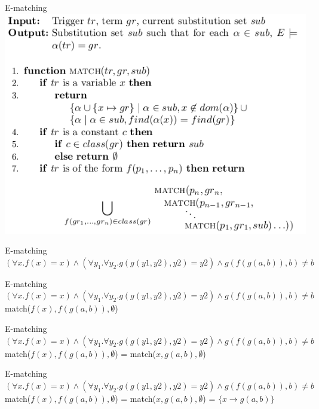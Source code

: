 \documentclass{beamer}
\begin{document}
\begin{frame}{E-matching}
\includegraphics[scale=0.5]{e-matching.png}
\end{frame}

\begin{frame}{E-matching}
$(\forall x.f(x) = x) \wedge (\forall y_1 .\forall y_2 .g(g(y1, y2), y2) = y2) \wedge g(f(g(a, b)), b) \neq b$\newline
\end{frame}

\begin{frame}{E-matching}
$(\forall x.f(x) = x) \wedge (\forall y_1 .\forall y_2 .g(g(y1, y2), y2) = y2) \wedge g(f(g(a, b)), b) \neq b$\newline
match($f(x), f(g(a, b)), \emptyset$)\newline
\end{frame}

\begin{frame}{E-matching}
$(\forall x.f(x) = x) \wedge (\forall y_1 .\forall y_2 .g(g(y1, y2), y2) = y2) \wedge g(f(g(a, b)), b) \neq b$\newline
match($f(x), f(g(a, b)), \emptyset$) =\newline
match($x, g(a, b), \emptyset$)\newline
\end{frame}

\begin{frame}{E-matching}
$(\forall x.f(x) = x) \wedge (\forall y_1 .\forall y_2 .g(g(y1, y2), y2) = y2) \wedge g(f(g(a, b)), b) \neq b$\newline
match($f(x), f(g(a, b)), \emptyset$) =\newline
match($x, g(a, b), \emptyset$) =\newline
$\{x \rightarrow g(a, b)\}$\newline
\end{frame}
\end{document}
